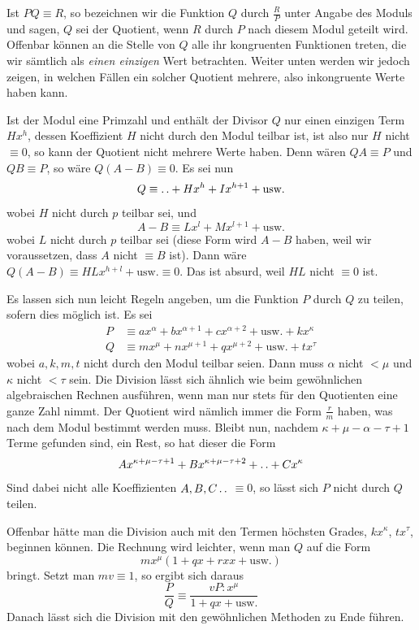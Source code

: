 Ist $PQ\equiv R$, so bezeichnen wir die Funktion $Q$ durch $\frac RP$ unter Angabe des Moduls und sagen, $Q$ sei der Quotient, wenn $R$ durch $P$ nach diesem Modul geteilt wird. Offenbar können an die Stelle von $Q$ alle ihr kongruenten Funktionen treten, die wir sämtlich als \emph{einen einzigen} Wert betrachten. Weiter unten werden wir jedoch zeigen, in welchen Fällen ein solcher Quotient mehrere, also inkongruente Werte haben kann.

Ist der Modul eine Primzahl und enthält der Divisor $Q$ nur einen einzigen Term $Hx^h$, dessen Koeffizient $H$ nicht durch den Modul teilbar ist, ist also nur $H$ nicht $\equiv0$, so kann der Quotient nicht mehrere Werte haben. Denn wären $QA\equiv P$ und $QB\equiv P$, so wäre $Q(A-B)\equiv0$. Es sei nun
\[
Q\equiv\mathinner{.\,.}+Hx^h+Ix^{h+1}+\text{usw.}
\]
wobei $H$ nicht durch $p$ teilbar sei, und
\[
A-B\equiv Lx^l+Mx^{l+1}+\text{usw.}
\]
wobei $L$ nicht durch $p$ teilbar sei (diese Form wird $A-B$ haben, weil wir voraussetzen, dass $A$ nicht $\equiv B$ ist). Dann wäre $Q(A-B)\equiv HLx^{h+l}+\text{usw.}\equiv0$. Das ist absurd, weil $HL$ nicht $\equiv0$ ist.

Es lassen sich nun leicht Regeln angeben, um die Funktion $P$ durch $Q$ zu teilen, sofern dies möglich ist. Es sei
\[
\begin{aligned}
P&\equiv ax^\alpha+bx^{\alpha+1}+cx^{\alpha+2}+\text{usw.}+kx^\kappa\\
Q&\equiv mx^\mu+nx^{\mu+1}+qx^{\mu+2}+\text{usw.}+tx^\tau
\end{aligned}
\]
wobei $a,k,m,t$ nicht durch den Modul teilbar seien. Dann muss $\alpha$ nicht $<\mu$ und $\kappa$ nicht $<\tau$ sein. Die Division lässt sich ähnlich wie beim gewöhnlichen algebraischen Rechnen ausführen, wenn man nur stets für den Quotienten eine ganze Zahl nimmt. Der Quotient wird nämlich immer
die Form $\frac rm$ haben, was nach dem Modul bestimmt werden muss. Bleibt nun, nachdem $\kappa+\mu-\alpha-\tau+1$ Terme gefunden sind, ein Rest, so hat dieser die Form
\[
Ax^{\kappa+\mu-\tau+1}+Bx^{\kappa+\mu-\tau+2}+\mathinner{.\,.}+Cx^\kappa
\]
Sind dabei nicht alle Koeffizienten $A,B,C\mathinner{.\,.}$ $\equiv0$, so lässt sich $P$ nicht durch $Q$ teilen.

Offenbar hätte man die Division auch mit den Termen höchsten Grades, $kx^\kappa$, $tx^\tau$, beginnen können. Die Rechnung wird leichter, wenn man $Q$ auf die Form
\[
mx^\mu(1+qx+rxx+\text{usw.})
\]
bringt. Setzt man $mv\equiv1$, so ergibt sich daraus
\[
\frac PQ\equiv\frac{vP:x^\mu}{1+qx+\text{usw.}}
\]
Danach lässt sich die Division mit den gewöhnlichen Methoden zu Ende führen.

